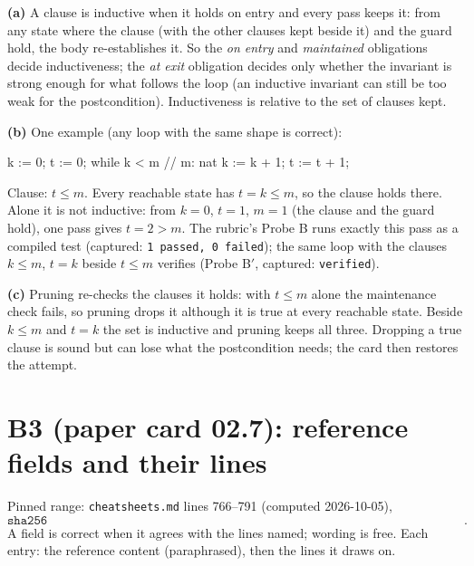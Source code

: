 \documentclass[11pt]{article}
\begin{document}
\textbf{(a)} A clause is inductive when it holds on entry and every pass keeps
it: from any state where the clause (with the other clauses kept beside it)
and the guard hold, the body re-establishes it. So the \emph{on entry} and
\emph{maintained} obligations decide inductiveness; the \emph{at exit}
obligation decides only whether the invariant is strong enough for what
follows the loop (an inductive invariant can still be too weak for the
postcondition). Inductiveness is relative to the set of clauses kept.

\textbf{(b)} One example (any loop with the same shape is correct):
\begin{dafnycode}
k := 0;
t := 0;
while k < m        // m: nat
{
  k := k + 1;
  t := t + 1;
}
\end{dafnycode}
Clause: $t \leq m$. Every reachable state has $t = k \leq m$, so the clause
holds there. Alone it is not inductive: from $k = 0$, $t = 1$, $m = 1$ (the
clause and the guard hold), one pass gives $t = 2 > m$. The rubric's Probe B
runs exactly this pass as a compiled test (captured: \texttt{1 passed, 0
failed}); the same loop with the clauses $k \leq m$, $t = k$ beside $t \leq m$
verifies (Probe B$'$, captured: \texttt{verified}).

\textbf{(c)} Pruning re-checks the clauses it holds: with $t \leq m$ alone the
maintenance check fails, so pruning drops it although it is true at every
reachable state. Beside $k \leq m$ and $t = k$ the set is inductive and pruning
keeps all three. Dropping a true clause is sound but can lose what the
postcondition needs; the card then restores the attempt.

\section*{B3 (paper card 02.7): reference fields and their lines}

Pinned range: \texttt{cheatsheets.md} lines 766--791 (computed 2026-10-05),
\[ \texttt{sha256 04b270b5bf2545aa6727055642d13097d8abedc941d775dc6dc78ec3ae7be6cc}. \]
A field is correct when it agrees with the lines named; wording is free. Each
entry: the reference content (paraphrased), then the lines it draws on.
\end{document}
